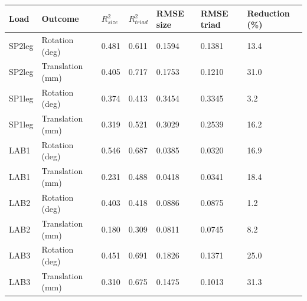 \begin{tabular}{lllllll}
\toprule
Load & Outcome & $R^2_{size}$ & $R^2_{triad}$ & RMSE size & RMSE triad & Reduction (\%) \\
\midrule
SP2leg & Rotation (deg) & 0.481 & 0.611 & 0.1594 & 0.1381 & 13.4 \\
SP2leg & Translation (mm) & 0.405 & 0.717 & 0.1753 & 0.1210 & 31.0 \\
SP1leg & Rotation (deg) & 0.374 & 0.413 & 0.3454 & 0.3345 & 3.2 \\
SP1leg & Translation (mm) & 0.319 & 0.521 & 0.3029 & 0.2539 & 16.2 \\
LAB1 & Rotation (deg) & 0.546 & 0.687 & 0.0385 & 0.0320 & 16.9 \\
LAB1 & Translation (mm) & 0.231 & 0.488 & 0.0418 & 0.0341 & 18.4 \\
LAB2 & Rotation (deg) & 0.403 & 0.418 & 0.0886 & 0.0875 & 1.2 \\
LAB2 & Translation (mm) & 0.180 & 0.309 & 0.0811 & 0.0745 & 8.2 \\
LAB3 & Rotation (deg) & 0.451 & 0.691 & 0.1826 & 0.1371 & 25.0 \\
LAB3 & Translation (mm) & 0.310 & 0.675 & 0.1475 & 0.1013 & 31.3 \\
\bottomrule
\end{tabular}
